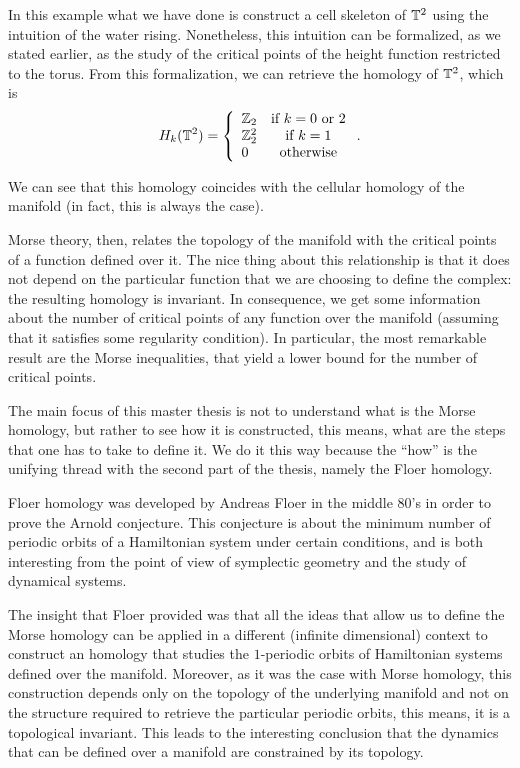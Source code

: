 In this example what we have done is construct a cell skeleton of $\mathbb{T}^2$ using the intuition of the water rising. Nonetheless, this intuition can be formalized, as we stated earlier, as the study of the critical points of the height function restricted to the torus. From this formalization, we can retrieve the homology of $\mathbb{T}^2$, which is
\[H_k(\mathbb{T}^2) = \left\{ \begin{array}{lc} \mathbb{Z}_2 & \text{if } k=0 \text{ or } 2 \\ \mathbb{Z}_2^2 & \text{if } k=1 \\ 0 & \text{otherwise} \end{array} \right. .\]

We can see that this homology coincides with the cellular homology of the manifold (in fact, this is always the case).

Morse theory, then, relates the topology of the manifold with the critical points of a function defined over it. The nice thing about this relationship is that it does not depend on the particular function that we are choosing to define the complex: the resulting homology is invariant. In consequence, we get some information about the number of critical points of any function over the manifold (assuming that it satisfies some regularity condition). In particular, the most remarkable result are the Morse inequalities, that yield a lower bound for the number of critical points.

The main focus of this master thesis is not to understand what is the Morse homology, but rather to see how it is constructed, this means, what are the steps that one has to take to define it. We do it this way because the “how” is the unifying thread with the second part of the thesis, namely the Floer homology.

Floer homology was developed by Andreas Floer in the middle 80's in order to prove the Arnold conjecture. This conjecture is about the minimum number of periodic orbits of a Hamiltonian system under certain conditions, and is both interesting from the point of view of symplectic geometry and the study of dynamical systems.

The insight that Floer provided was that all the ideas that allow us to define the Morse homology can be applied in a different (infinite dimensional) context to construct an homology that studies the $1$-periodic orbits of Hamiltonian systems defined over the manifold. Moreover, as it was the case with Morse homology, this construction depends only on the topology of the underlying manifold and not on the structure required to retrieve the particular periodic orbits, this means, it is a topological invariant. This leads to the interesting conclusion that the dynamics that can be defined over a manifold are constrained by its topology.

